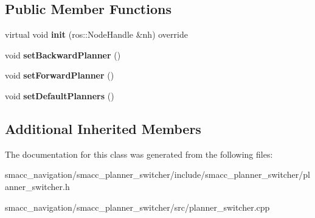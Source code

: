 \subsection*{Public Member Functions}
\begin{DoxyCompactItemize}
\item 
\hypertarget{classsmacc__planner__switcher_1_1PlannerSwitcher_a156075677c6774e8933135ad8cc38f60}{virtual void {\bfseries init} (ros\-::\-Node\-Handle \&nh) override}\label{classsmacc__planner__switcher_1_1PlannerSwitcher_a156075677c6774e8933135ad8cc38f60}

\item 
\hypertarget{classsmacc__planner__switcher_1_1PlannerSwitcher_a848558a4309a42c546ab87e65722da2f}{void {\bfseries set\-Backward\-Planner} ()}\label{classsmacc__planner__switcher_1_1PlannerSwitcher_a848558a4309a42c546ab87e65722da2f}

\item 
\hypertarget{classsmacc__planner__switcher_1_1PlannerSwitcher_a6510ee1f23243ee725c61e590354d3bc}{void {\bfseries set\-Forward\-Planner} ()}\label{classsmacc__planner__switcher_1_1PlannerSwitcher_a6510ee1f23243ee725c61e590354d3bc}

\item 
\hypertarget{classsmacc__planner__switcher_1_1PlannerSwitcher_a9672bbbb245b3a5120b365810c9cc746}{void {\bfseries set\-Default\-Planners} ()}\label{classsmacc__planner__switcher_1_1PlannerSwitcher_a9672bbbb245b3a5120b365810c9cc746}

\end{DoxyCompactItemize}
\subsection*{Additional Inherited Members}


The documentation for this class was generated from the following files\-:\begin{DoxyCompactItemize}
\item 
smacc\-\_\-navigation/smacc\-\_\-planner\-\_\-switcher/include/smacc\-\_\-planner\-\_\-switcher/planner\-\_\-switcher.\-h\item 
smacc\-\_\-navigation/smacc\-\_\-planner\-\_\-switcher/src/planner\-\_\-switcher.\-cpp\end{DoxyCompactItemize}
